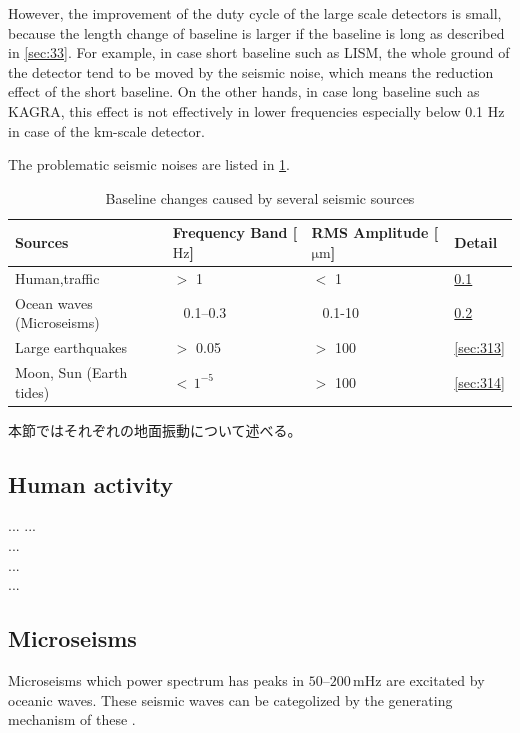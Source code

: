 However, the improvement of the duty cycle of the large scale detectors is small, because the length change of baseline is larger if the baseline is long as described in \cref{sec:33}. For example, in case short baseline such as LISM, the whole ground of the detector tend to be moved by the seismic noise, which means the reduction effect of the short baseline. On the other hands, in case long baseline such as KAGRA, this effect is not effectively in lower frequencies especially below 0.1 $\mathrm{Hz}$ in case of the km-scale detector. 

The problematic seismic noises are listed in \ref{tb:310}.

\begin{table}[H]
  \centering
  \caption{Baseline changes caused by several seismic sources}
  \begin{tabular}{llll}
    \hline
    Sources & Frequency Band [$\mathrm{Hz}$]  & RMS Amplitude [$\mathrm{\mu m}$] & Detail\\
    \hline
    Human,traffic            & $>$ 1             & $<$ 1         & \cref{sec:311}\\
    Ocean waves (Microseisms)& $\ \ $ 0.1--0.3   & $\ \ $ 0.1-10 & \cref{sec:312}\\
    Large earthquakes        & $>$ 0.05          & $>$ 100       & \cref{sec:313}\\    
    Moon, Sun (Earth tides)  & $<\, 1^{-5}$      & $>$ 100       & \cref{sec:314}\\
    \hline
  \end{tabular}\label{tb:310}
\end{table}


本節ではそれぞれの地面振動について述べる。

\subsection{Human activity} \label{sec:311}
...
...\\
...\\
...\\
...\\

\subsection{Microseisms} \label{sec:312}
Microseisms which power spectrum has peaks in $50$--$200\,\mathrm{mHz}$ are excitated by oceanic waves. These seismic waves can be categolized by the generating mechanism of these \cite{Bormann2012new}.

